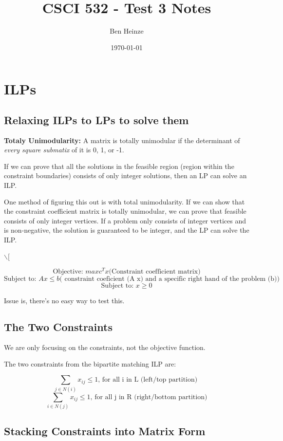 \documentclass[11pt]{article}
\author{Ben Heinze}
\date{\today}
\title{CSCI 532 - Test 3 Notes}
\begin{document}
\maketitle

\section{ILPs}
\label{sec:org7c1cb1c}

\subsection{Relaxing ILPs to LPs to solve them}
\label{sec:org620df3d}

\textbf{\textbf{Totaly Unimodularity:}} A matrix is totally unimodular if the determinant of \emph{every square submatix} of it is 0, 1, or -1.

If we can prove that all the solutions in the feasible region (region within the constraint boundaries) consists of only integer solutions, then an LP can solve an ILP.

One method of figuring this out is with total unimodularity. If we can show that the constraint coefficient matrix is totally unimodular, we can prove that feasible consists of only integer vertices. If a problem only consists of integer vertices and is non-negative, the solution is guaranteed to be integer, and the LP can solve the ILP.

$\backslash$[

\[ \text{Objective: } max c^T x \text{(Constraint coefficient matrix)} \]
\[ \text{Subject to: } A x \leq b  \text{( constraint coeficient (A x) and a specific right hand of the problem (b))}  \]
\[ \text{Subject to: } x \geq 0    \]

Issue is, there's no easy way to test this.

\subsection{The Two Constraints}
\label{sec:org032452a}

We are only focusing on the constraints, not the objective function.

The two constraints from the bipartite matching ILP are:


\[ \sum_{j \in N(i)} x_{ij} \leq 1  \text{, for all i in L  (left/top partition) }\]
\[ \sum_{i \in N(j)} x_{ij} \leq 1   \text{, for all j in R  (right/bottom partition)} \]


\subsection{Stacking Constraints into Matrix Form}
\label{sec:org0b0e5c9}
\end{document}
